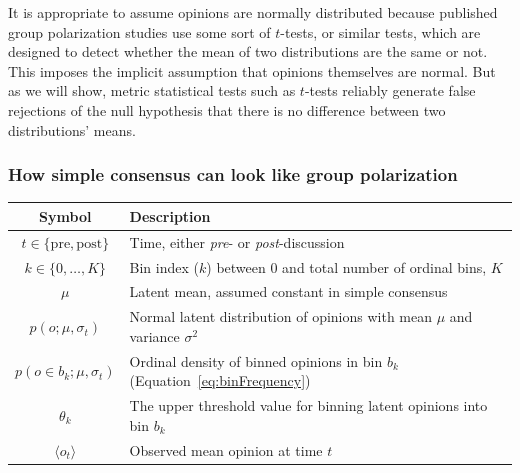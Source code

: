 \documentclass[11pt, letterpaper]{article}
\begin{document}
It is appropriate to assume opinions are normally distributed because published
group polarization studies use some sort of $t$-tests, or similar tests, which are designed
to detect whether the mean of two distributions are the same or not. This imposes the
implicit assumption that opinions themselves are normal. But as we will show, 
metric statistical tests such as $t$-tests reliably generate false rejections
of the null hypothesis that there is no difference between two distributions' means.

\subsubsection{How simple consensus can look like group polarization}

\begin{table}[h]
  \begin{tabular}{cp{5.0in}} \toprule
   Symbol & Description  \\ \midrule  
   $t \in \{\mathrm{pre}, \mathrm{post}\}$ & Time, either \emph{pre}- or
                                           \emph{post}-discussion \\
   $k \in \{0,\ldots,K\} $ & Bin index ($k$) between 0 and total number of
         ordinal bins, $K$ \\
   $\mu$  &   Latent mean, assumed constant in simple consensus \\ 
   $p(o;\mu,\sigma_t)$ & Normal latent distribution of opinions with mean
                         $\mu$ and variance $\sigma^2$ \\
   $p(o \in b_k; \mu, \sigma_t)$ & Ordinal density of binned opinions in bin $b_k$ 
            (Equation~\ref{eq:binFrequency}) \\
   $\theta_k$  & The upper threshold value for binning latent opinions into
   bin $b_k$ \\
   $\langle o_t \rangle$  &   Observed mean opinion at time $t$ \\
   \bottomrule
  \end{tabular} 
\end{table}
\end{document}

